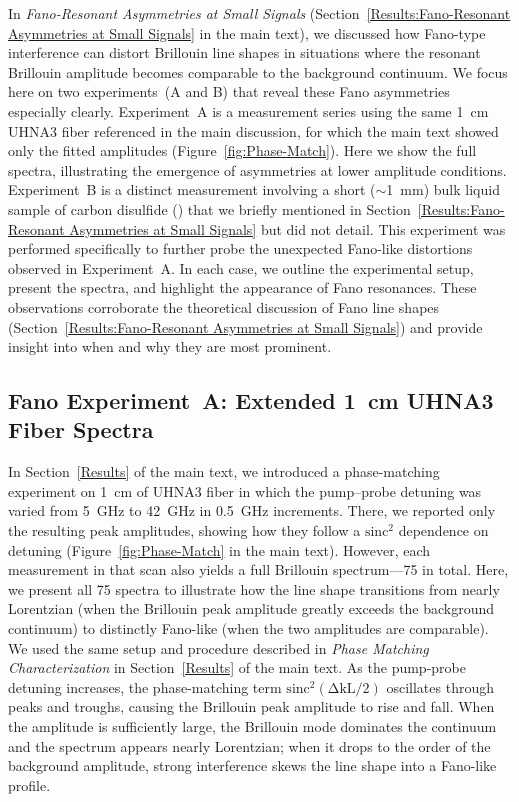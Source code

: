 In \textit{Fano-Resonant Asymmetries at Small Signals} (Section~\ref{Results:Fano-Resonant Asymmetries at Small Signals} in the main text), we discussed how Fano-type interference can distort Brillouin line shapes in situations where the resonant Brillouin amplitude becomes comparable to the background continuum. We focus here on two experiments~(A and B) that reveal these Fano asymmetries especially clearly. Experiment~A is a measurement series using the same \SI{1}{\centi\meter} \ac{UHNA3} fiber referenced in the main discussion, for which the main text showed only the fitted amplitudes (Figure~\ref{fig:Phase-Match}). Here we show the full spectra, illustrating the emergence of asymmetries at lower amplitude conditions. Experiment~B is a distinct measurement involving a short (\(\sim\)\SI{1}{\milli\meter}) bulk liquid sample of carbon disulfide () that we briefly mentioned in Section~\ref{Results:Fano-Resonant Asymmetries at Small Signals} but did not detail. This experiment was performed specifically to further probe the unexpected Fano-like distortions observed in Experiment~A. In each case, we outline the experimental setup, present the spectra, and highlight the appearance of Fano resonances. These observations corroborate the theoretical discussion of Fano line shapes (Section~\ref{Results:Fano-Resonant Asymmetries at Small Signals}) and provide insight into when and why they are most prominent.

\subsection{Fano Experiment~A: Extended \SI{1}{\centi\meter} UHNA3 Fiber Spectra}
\label{Appendix:Fano:Experiment A}

In Section~\ref{Results} of the main text, we introduced a phase-matching experiment on \SI{1}{\centi\meter} of \ac{UHNA3} fiber in which the pump--probe detuning was varied from \SI{5}{\giga\hertz} to \SI{42}{\giga\hertz} in \SI{0.5}{\giga\hertz} increments. There, we reported only the resulting peak amplitudes, showing how they follow a \(\mathrm{sinc^{2}}\) dependence on detuning (Figure~\ref{fig:Phase-Match} in the main text). However, each measurement in that scan also yields a full Brillouin spectrum—75 in total. Here, we present all 75 spectra to illustrate how the line shape transitions from nearly Lorentzian (when the Brillouin peak amplitude greatly exceeds the background continuum) to distinctly Fano-like (when the two amplitudes are comparable). We used the same setup and procedure described in \textit{Phase Matching Characterization} in Section~\ref{Results} of the main text. As the pump-probe detuning increases, the phase-matching term \(\mathrm{sinc^{2}(\Delta kL/2)}\) oscillates through peaks and troughs, causing the Brillouin peak amplitude to rise and fall. When the amplitude is sufficiently large, the Brillouin mode dominates the continuum and the spectrum appears nearly Lorentzian; when it drops to the order of the background amplitude, strong interference skews the line shape into a Fano-like profile.


